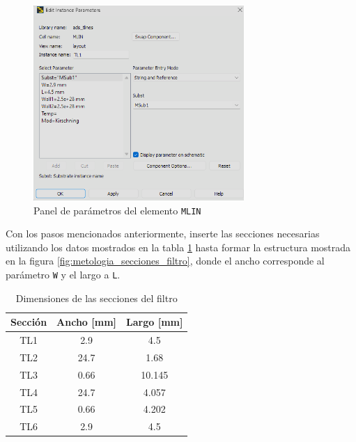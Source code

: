 \begin{figure}[!ht]
    \centering
    \includegraphics[width=8cm]{figures/metodologia/metologia2.png}
    \caption{Panel de parámetros del elemento \texttt{MLIN}}
    \label{fig:metologia_mlin_dimensiones}
\end{figure}

Con los pasos mencionados anteriormente, inserte las secciones necesarias utilizando los datos mostrados en la tabla \ref{table:metodologia_dimensiones} hasta formar la estructura mostrada en la figura \ref{fig:metologia_secciones_filtro}, donde el ancho corresponde al parámetro \texttt{W} y el largo a \texttt{L}. \\

\begin{table}[!ht]
\centering
\caption{Dimensiones de las secciones del filtro}
\label{table:metodologia_dimensiones}
\begin{tabular}{|c|c|c|}
\hline
Sección & Ancho {[}mm{]} & Largo {[}mm{]} \\ \hline
TL1     & 2.9            & 4.5            \\ \hline
TL2     & 24.7           & 1.68           \\ \hline
TL3     & 0.66           & 10.145         \\ \hline
TL4     & 24.7           & 4.057          \\ \hline
TL5     & 0.66           & 4.202          \\ \hline
TL6     & 2.9            & 4.5            \\ \hline
\end{tabular}
\end{table}

